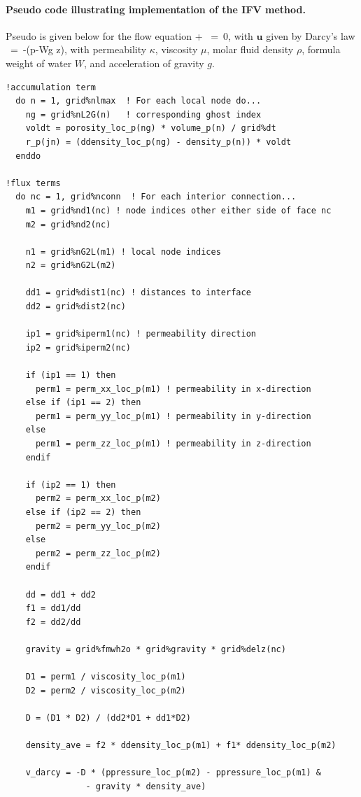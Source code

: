 \documentclass[12pt]{article}
\def\EQ#1\EN{\begin{equation}#1\end{equation}}
\newcommand{\eq}{\ =\ }
\newcommand{\p}{{\partial}}
\newcommand{\bnabla}{\boldsymbol{\nabla}}
\newcommand{\bu}{\boldsymbol{u}}
\begin{document}
\paragraph*{Pseudo code illustrating implementation of the IFV method.}

Pseudo is given below for the flow equation
\EQ
\frac{\p}{\p t} \varphi\rho + \bnabla\cdot\rho\bu\eq 0,
\EN
with $\bu$ given by Darcy's law
\EQ
\bu\eq-\frac{\kappa}{\mu}\nabla\big(p-W\rho g z\big),
\EN
with permeability $\kappa$, viscosity $\mu$, molar fluid density $\rho$, formula weight of water $W$, and acceleration of gravity $g$.
\begin{verbatim}
!accumulation term
  do n = 1, grid%nlmax  ! For each local node do...
    ng = grid%nL2G(n)   ! corresponding ghost index
    voldt = porosity_loc_p(ng) * volume_p(n) / grid%dt
    r_p(jn) = (ddensity_loc_p(ng) - density_p(n)) * voldt
  enddo

!flux terms
  do nc = 1, grid%nconn  ! For each interior connection...
    m1 = grid%nd1(nc) ! node indices other either side of face nc
    m2 = grid%nd2(nc)

    n1 = grid%nG2L(m1) ! local node indices
    n2 = grid%nG2L(m2)
    
    dd1 = grid%dist1(nc) ! distances to interface
    dd2 = grid%dist2(nc)
    
    ip1 = grid%iperm1(nc) ! permeability direction
    ip2 = grid%iperm2(nc)
    
    if (ip1 == 1) then
      perm1 = perm_xx_loc_p(m1) ! permeability in x-direction
    else if (ip1 == 2) then
      perm1 = perm_yy_loc_p(m1) ! permeability in y-direction
    else
      perm1 = perm_zz_loc_p(m1) ! permeability in z-direction
    endif
    
    if (ip2 == 1) then
      perm2 = perm_xx_loc_p(m2)
    else if (ip2 == 2) then
      perm2 = perm_yy_loc_p(m2)
    else
      perm2 = perm_zz_loc_p(m2)
    endif
    
    dd = dd1 + dd2
    f1 = dd1/dd
    f2 = dd2/dd
    
    gravity = grid%fmwh2o * grid%gravity * grid%delz(nc)

    D1 = perm1 / viscosity_loc_p(m1)
    D2 = perm2 / viscosity_loc_p(m2)

    D = (D1 * D2) / (dd2*D1 + dd1*D2)

    density_ave = f2 * ddensity_loc_p(m1) + f1* ddensity_loc_p(m2)

    v_darcy = -D * (ppressure_loc_p(m2) - ppressure_loc_p(m1) & 
                - gravity * density_ave)


\end{verbatim}
\end{document}
